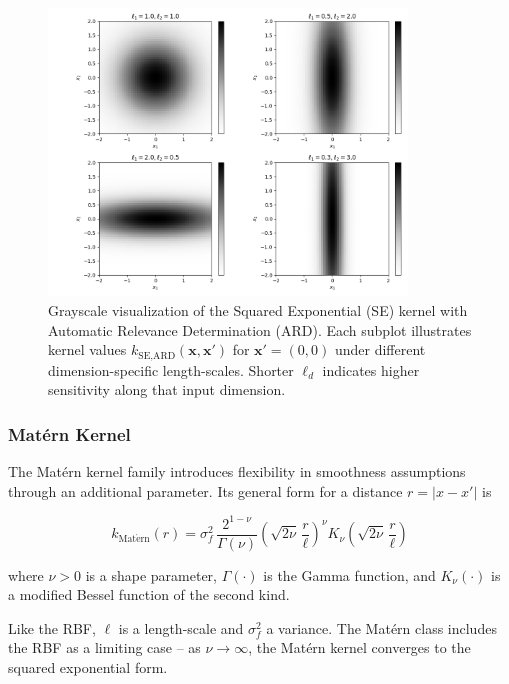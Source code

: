\documentclass{ut-thesis}
\begin{document}
\begin{figure}[htbp]
    \centering
    \includegraphics[width=0.85\textwidth]{rbf_with_ard.png}
    \caption[Visualization of the Squared Exponential kernel with Automatic Relevance Determination. ]
        {Grayscale visualization of the Squared Exponential (SE) kernel with Automatic Relevance Determination (ARD). 
        Each subplot illustrates kernel values \( k_{\text{SE,ARD}}(\mathbf{x}, \mathbf{x'}) \) for $\mathbf{x'} = (0, 0)$ under different dimension-specific length-scales. Shorter \( \ell_d \) indicates higher sensitivity along that input dimension.
    }
    \label{fig:ard_kernel_bw}
\end{figure}

\subsubsection{Matérn Kernel}
The Matérn kernel family introduces flexibility in smoothness assumptions through an additional parameter\cite{rasmussen2006gaussian}. Its general form for a distance $r = |x - x'|$ is

\begin{equation}
    k_{\mathrm{Mat\acute{e}rn}}(r)
= \sigma_f^2 \,\frac{2^{1-\nu}}{\Gamma(\nu)}
\left(\sqrt{2\nu}\,\frac{r}{\ell}\right)^{\nu}
K_{\nu}\!\left(\sqrt{2\nu}\,\frac{r}{\ell}\right)
\end{equation}

where $\nu > 0$ is a shape parameter, $\Gamma(\cdot)$ is the Gamma function, and $K_{\nu}(\cdot)$ is a modified Bessel function of the second kind. 

Like the RBF, $\ell$ is a length-scale and $\sigma_f^2$ a variance. The Matérn class includes the RBF as a limiting case – as $\nu \to \infty$, the Matérn kernel converges to the squared exponential form. 
\end{document}
